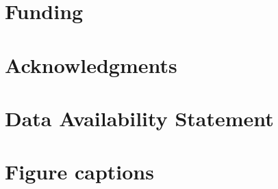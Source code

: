 \documentclass[utf8]{frontiersFPHY} %
\begin{document}
\section*{Funding}


\section*{Acknowledgments}




\section*{Data Availability Statement}






\section*{Figure captions}


\end{document}
